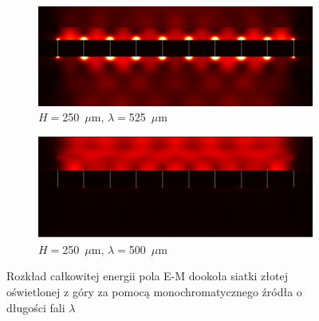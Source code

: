 \begin{figure}[bth]
	\begin{subfigure}{0.45\textwidth}
		\includegraphics[width=\textwidth]{images/thz/con_src_l525.png}
		\caption{$H=$250~$\mu$m, $\lambda=$525~$\mu$m}
		\label{fig:consrcl525}
	\end{subfigure}
	\begin{subfigure}{0.45\textwidth}
		\includegraphics[width=\textwidth]{images/thz/con_src_l500.png}
		\caption{$H=$250~$\mu$m, $\lambda=$500~$\mu$m}
		\label{fig:consrcl500}
	\end{subfigure}
	\caption{Rozkład całkowitej energii pola E-M dookoła siatki złotej oświetlonej z góry za pomocą monochromatycznego źródła o długości fali $\lambda$} 
\end{figure}

